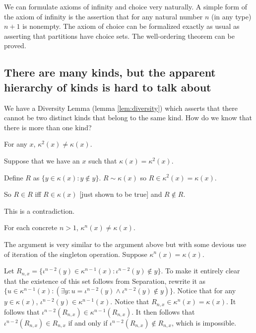 \documentclass[12pt]{article}
\begin{document}
We can formulate axioms of infinity and choice very naturally.  A simple form of the axiom of infinity is the assertion that for any natural number $n$ (in any type) $n+1$ is nonempty.  The axiom of choice can be formalized exactly as usual as asserting that partitions have choice sets.  The well-ordering theorem can be proved.



\subsection{There are many kinds, but the apparent hierarchy of kinds is hard to talk about}

We have a Diversity Lemma (lemma \ref{lem:diversity}) which asserts
that there cannot be two distinct kinds that belong to the same kind.
How do we know that there is more than one kind?



\begin{thm} For any $x$, $\kappa^2(x) \neq \kappa(x)$.\end{thm}

\Proof

Suppose that we have an $x$ such that $\kappa(x) = \kappa^2(x)$.

Define $R$ as $\{y \in \kappa(x):y \not\in y\}$.  $R \sim \kappa(x)$ so $R \in \kappa^2(x) = \kappa(x)$.

So $R \in R$ iff $R \in \kappa(x)$ [just shown to be true] and $R \not\in R$.

This is a contradiction.

\endproof



\begin{thm}\label{thm:diff}
  For each concrete $n>1$, $\kappa^n(x) \neq \kappa(x)$.\end{thm}

\Proof

The argument is very similar to the argument above but with some devious use of iteration of the singleton operation.  Suppose $\kappa^n(x)=\kappa(x)$.

Let $R_{n,x} = \{\iota^{n-2}(y)\in \kappa^{n-1}(x):\iota^{n-2}(y) \not\in y\}$.
To make it entirely clear that the existence of this set follows from Separation, rewrite it as $\{u\in \kappa^{n-1}(x):(\exists y:u = \iota^{n-2}(y) \wedge \iota^{n-2}(y) \not\in y)\}$. Notice that
for any $y \in \kappa(x)$, $\iota^{n-2}(y)\in \kappa^{n-1}(x)$.  Notice that $R_{n,x} \in \kappa^n(x) = \kappa(x)$.  It follows that $\iota^{n-2}(R_{n,x})\in \kappa^{n-1}(R_{n,x})$.  It then follows that $\iota^{n-2}(R_{n,x})\in R_{n,x}$ if and only if $\iota^{n-2}(R_{n,x}) \not\in R_{n,x}$, which is impossible.
\end{document}

